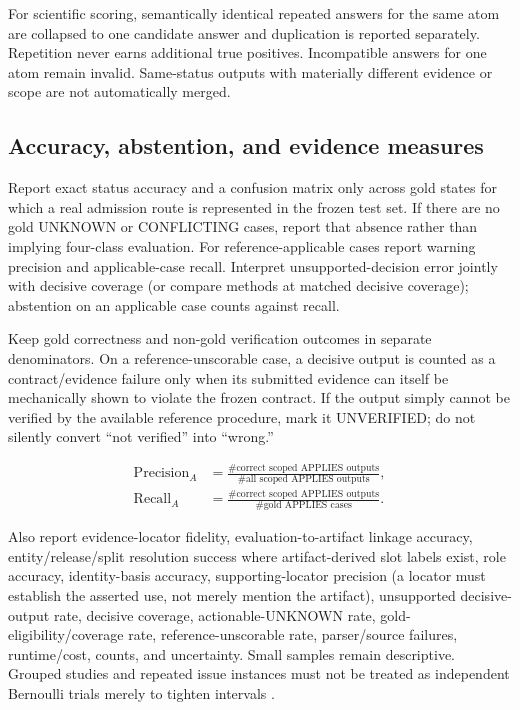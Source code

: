 \documentclass[11pt,a4paper]{article}
\newcommand{\status}[1]{\textsf{\small #1}}
\begin{document}
For scientific scoring, semantically identical repeated answers for the same atom are collapsed to one candidate answer and duplication is reported separately. Repetition never earns additional true positives. Incompatible answers for one atom remain invalid. Same-status outputs with materially different evidence or scope are not automatically merged.

\subsection{Accuracy, abstention, and evidence measures}
Report exact status accuracy and a confusion matrix only across gold states for which a real admission route is represented in the frozen test set. If there are no gold \status{UNKNOWN} or \status{CONFLICTING} cases, report that absence rather than implying four-class evaluation. For reference-applicable cases report warning precision and applicable-case recall. Interpret unsupported-decision error jointly with decisive coverage (or compare methods at matched decisive coverage); abstention on an applicable case counts against recall.

Keep gold correctness and non-gold verification outcomes in separate denominators. On a reference-unscorable case, a decisive output is counted as a contract/evidence failure only when its submitted evidence can itself be mechanically shown to violate the frozen contract. If the output simply cannot be verified by the available reference procedure, mark it \status{UNVERIFIED}; do not silently convert ``not verified'' into ``wrong.''

\begin{align*}
\mathrm{Precision}_A &= \frac{\#\text{correct scoped APPLIES outputs}}{\#\text{all scoped APPLIES outputs}},\\
\mathrm{Recall}_A &= \frac{\#\text{correct scoped APPLIES outputs}}{\#\text{gold APPLIES cases}}.
\end{align*}

Also report evidence-locator fidelity, evaluation-to-artifact linkage accuracy, entity/release/split resolution success where artifact-derived slot labels exist, role accuracy, identity-basis accuracy, supporting-locator precision (a locator must establish the asserted use, not merely mention the artifact), unsupported decisive-output rate, decisive coverage, actionable-UNKNOWN rate, gold-eligibility/coverage rate, reference-unscorable rate, parser/source failures, runtime/cost, counts, and uncertainty. Small samples remain descriptive. Grouped studies and repeated issue instances must not be treated as independent Bernoulli trials merely to tighten intervals \cite{nistbinomial}.
\end{document}
